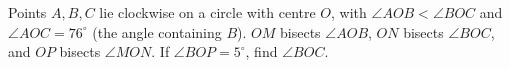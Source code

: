 Points $A,B,C$ lie clockwise on a circle with centre $O$, with $\angle AOB<\angle BOC$ and $\angle AOC=76^\circ$ (the angle containing $B$). $OM$ bisects $\angle AOB$, $ON$ bisects $\angle BOC$, and $OP$ bisects $\angle MON$. If $\angle BOP=5^\circ$, find $\angle BOC$.

